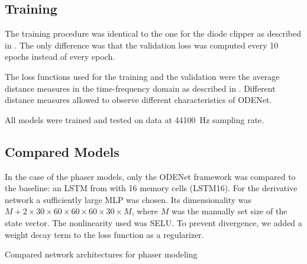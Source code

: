 \subsection{Training}
\label{sec:phaser_training}
The training procedure was identical to the one for the diode clipper as described in . The only difference was that the validation loss was computed every 10 epochs instead of every epoch.

The loss functions used for the training and the validation were the average distance measures in the time-frequency domain as described in . Different distance measures allowed to observe different characteristics of ODENet.


All models were trained and tested on data at \SI{44100}{Hz} sampling rate.

\subsection{Compared Models}
\label{sec:phaser_models}

In the case of the phaser models, only the ODENet framework was compared to the baseline: an \ac{LSTM} from \cite{Wright2020} with 16 memory cells (\ac{LSTM}16). For the derivative network a sufficiently large \ac{MLP} was chosen. Its dimensionality was $M + 2 \times 30 \times 60 \times 60\times 60 \times 30\times M$, where $M$ was the manually set size of the state vector. The nonlinearity used was \ac{SELU}. To prevent divergence, we added a weight decay term to the loss function as a regularizer.

\begin{table}[]
    \caption{Compared network architectures for phaser modeling}
    \centering
    
    \label{tab:phaser_models_data}
\end{table}

